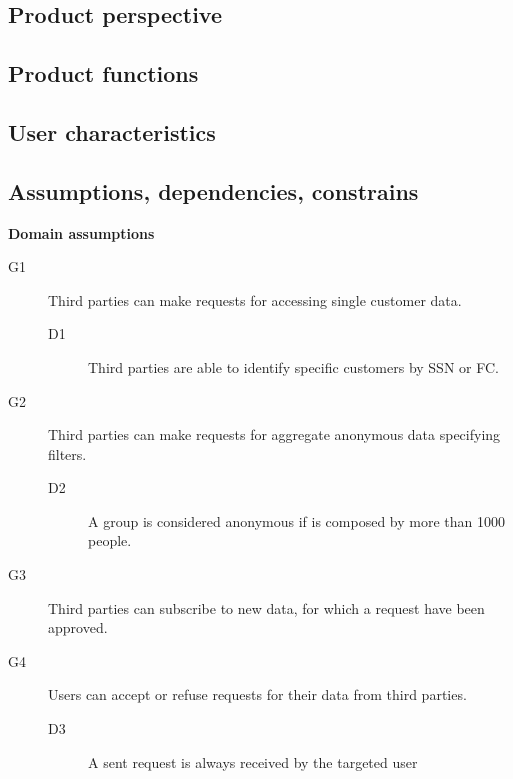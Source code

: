 \documentclass[../main.tex]{subfiles}
\begin{document}
\subsection{Product perspective}
\subsection{Product functions}
\subsection{User characteristics}
\subsection{Assumptions, dependencies, constrains}
{\bf Domain assumptions}

\begin{description}
    \item [G1]  Third parties can make requests for accessing single customer data.

        \begin{description}
            \item [D1]  Third parties are able to identify specific customers by SSN or FC.

        \end{description}
        
    \item [G2]  Third parties can make requests for aggregate anonymous data specifying filters.
        \begin{description}
            \item [D2]  A group is considered anonymous if is composed by more than 1000 people.

        \end{description}

    \item [G3]	Third parties can subscribe to new data, for which a request have been approved.
        \begin{description}
            \item

        \end{description}
        
    \item [G4]  Users can accept or refuse requests for their data from third parties.  
        \begin{description}
            \item [D3]  A sent request is always received by the targeted user


\end{description}
\end{description}
\end{document}

